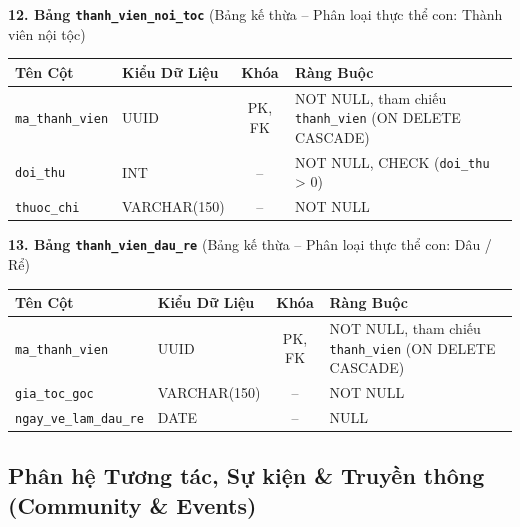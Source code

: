 \noindent\textbf{12. Bảng \texttt{thanh\_vien\_noi\_toc}} \quad (Bảng kế thừa -- Phân loại thực thể con: Thành viên nội tộc)
\vspace{0.2cm}

\begin{center}
\small
\renewcommand{\arraystretch}{1.2}
\begin{tabular}{|p{3.8cm}|p{2.5cm}|c|p{6.5cm}|}
\hline
\textbf{Tên Cột} & \textbf{Kiểu Dữ Liệu} & \textbf{Khóa} & \textbf{Ràng Buộc} \\ \hline
\texttt{ma\_thanh\_vien} & UUID & PK, FK & NOT NULL, tham chiếu \texttt{thanh\_vien} (ON DELETE CASCADE) \\ \hline
\texttt{doi\_thu} & INT & -- & NOT NULL, CHECK (\texttt{doi\_thu} > 0) \\ \hline
\texttt{thuoc\_chi} & VARCHAR(150) & -- & NOT NULL \\ \hline
\end{tabular}
\end{center}
\vspace{0.3cm}

\noindent\textbf{13. Bảng \texttt{thanh\_vien\_dau\_re}} \quad (Bảng kế thừa -- Phân loại thực thể con: Dâu / Rể)
\vspace{0.2cm}

\begin{center}
\small
\renewcommand{\arraystretch}{1.2}
\begin{tabular}{|p{3.8cm}|p{2.5cm}|c|p{6.5cm}|}
\hline
\textbf{Tên Cột} & \textbf{Kiểu Dữ Liệu} & \textbf{Khóa} & \textbf{Ràng Buộc} \\ \hline
\texttt{ma\_thanh\_vien} & UUID & PK, FK & NOT NULL, tham chiếu \texttt{thanh\_vien} (ON DELETE CASCADE) \\ \hline
\texttt{gia\_toc\_goc} & VARCHAR(150) & -- & NOT NULL \\ \hline
\texttt{ngay\_ve\_lam\_dau\_re} & DATE & -- & NULL \\ \hline
\end{tabular}
\end{center}
\vspace{0.3cm}

\subsection{Phân hệ Tương tác, Sự kiện \& Truyền thông (Community \& Events)}
\label{subsec:2_2_3_community_events}

